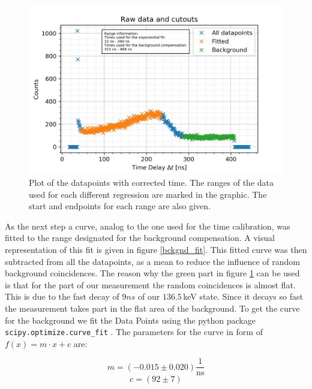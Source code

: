 \documentclass[30pt,a4paper]{article}
\begin{document}
 	
 	\begin{figure}[h]
 		\includegraphics{Bilder/raw_ranges}
 		\centering
 		\caption{\small Plot of the datapoints with corrected time. The ranges of the data used for each different regression are marked in the graphic. The start and endpoints for each range are also given.}
 		\label{raw_plot}
 	\end{figure}
 	
 	As the next step a curve, analog to the one used for the time calibration, was
 	fitted to the range designated for the background compensation. A visual
 	representation of this fit is given in figure \ref{bckgnd_fit}. This fitted curve
 	was then subtracted from all the datapoints, as a mean to reduce the influence of
 	random background coincidences. The reason why the green part in figure \ref{raw_plot} can be used is that for the part of our measurement the random coincidences is almost flat. This is due to the fast decay of $9ns$ of our $136.5$\,keV state. Since it decays so fast the measurement takes part in the flat area of the background. To get the curve for the background we fit the Data Points using the python package \verb|scipy.optimize.curve_fit| \cite{SciPy_Opti}.
 	The parameters for the curve in form of $f(x)=m\cdot x+c$ are:
 	
 	\begin{equation*}
 	m = (-0.015 \pm 0.020)\frac{1}{\textrm{ns}}
 	\end{equation*}
 	$$c = (92 \pm 7)$$
 	
 	
 	
\end{document}

